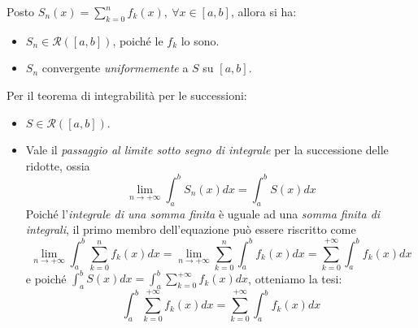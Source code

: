 \begin{demonstration}
	Posto $\displaystyle S_n\left(x\right)=\sum_{k=0}^{n}f_k\left(x\right),\ \forall x\in \left[a,b\right]$, allora si ha:
	\begin{itemize}
		\item $S_n\in\mathcal{R}\left(\left[a,b\right]\right)$, poiché le $f_k$ lo sono.
		\item $S_n$ convergente \textit{uniformemente} a $S$ su $\left[a,b\right]$.
	\end{itemize}
	Per il teorema di integrabilità per le successioni:
	\begin{itemize}
		\item $S\in\mathcal{R}\left(\left[a,b\right]\right)$.
		\item Vale il \textit{passaggio al limite sotto segno di integrale} per la successione delle ridotte, ossia
		\begin{equation*}
			\lim_{n\to+\infty}\int_{a}^{b}S_n\left(x\right)dx=\int_{a}^{b}S\left(x\right)dx
		\end{equation*}
		Poiché l'\textit{integrale di una somma finita} è uguale ad una \textit{somma finita di integrali}, il primo membro dell'equazione può essere riscritto come
		\begin{equation*}
			\lim_{n\to+\infty}\int_{a}^{b}\sum_{k=0}^{n}f_k\left(x\right)dx=\lim_{n\to+\infty}\sum_{k=0}^{n}\int_{a}^{b}f_k\left(x\right)dx=\sum_{k=0}^{+\infty}\int_{a}^{b}f_k\left(x\right)dx
		\end{equation*}
		e poiché $\displaystyle \int_{a}^{b}S\left(x\right)dx=\int_{a}^{b}\sum_{k=0}^{+\infty}f_k\left(x\right)dx$, otteniamo la tesi:
		\begin{equation*}
			\int_{a}^{b}\sum_{k=0}^{+\infty}f_k\left(x\right)dx=\sum_{k=0}^{+\infty}\int_{a}^{b}f_k\left(x\right)dx
		\end{equation*}
	\end{itemize}
\end{demonstration}
